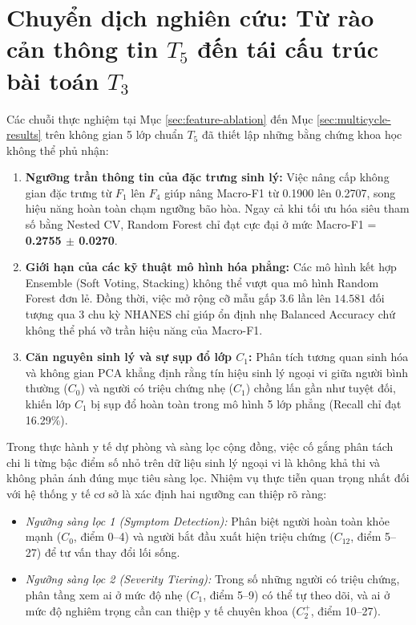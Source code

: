 \section{Chuyển dịch nghiên cứu: Từ rào cản thông tin $T_5$ đến tái cấu trúc bài toán $T_3$}
\label{sec:chuyen-dich-t5-t3}

Các chuỗi thực nghiệm tại Mục \ref{sec:feature-ablation} đến Mục \ref{sec:multicycle-results} trên không gian 5 lớp chuẩn $T_5$ đã thiết lập những bằng chứng khoa học không thể phủ nhận:
\begin{enumerate}
    \item \textbf{Ngưỡng trần thông tin của đặc trưng sinh lý:} Việc nâng cấp không gian đặc trưng từ $F_1$ lên $F_4$ giúp nâng Macro-F1 từ 0.1900 lên 0.2707, song hiệu năng hoàn toàn chạm ngưỡng bão hòa. Ngay cả khi tối ưu hóa siêu tham số bằng Nested CV, Random Forest chỉ đạt cực đại ở mức Macro-F1 = \textbf{0.2755 $\pm$ 0.0270}.
    \item \textbf{Giới hạn của các kỹ thuật mô hình hóa phẳng:} Các mô hình kết hợp Ensemble (Soft Voting, Stacking) không thể vượt qua mô hình Random Forest đơn lẻ. Đồng thời, việc mở rộng cỡ mẫu gấp 3.6 lần lên $14.581$ đối tượng qua 3 chu kỳ NHANES chỉ giúp ổn định nhẹ Balanced Accuracy chứ không thể phá vỡ trần hiệu năng của Macro-F1.
    \item \textbf{Căn nguyên sinh lý và sự sụp đổ lớp $C_1$:} Phân tích tương quan sinh hóa và không gian PCA khẳng định rằng tín hiệu sinh lý ngoại vi giữa người bình thường ($C_0$) và người có triệu chứng nhẹ ($C_1$) chồng lấn gần như tuyệt đối, khiến lớp $C_1$ bị sụp đổ hoàn toàn trong mô hình 5 lớp phẳng (Recall chỉ đạt 16.29\%).
\end{enumerate}

Trong thực hành y tế dự phòng và sàng lọc cộng đồng, việc cố gắng phân tách chi li từng bậc điểm số nhỏ trên dữ liệu sinh lý ngoại vi là không khả thi và không phản ánh đúng mục tiêu sàng lọc. Nhiệm vụ thực tiễn quan trọng nhất đối với hệ thống y tế cơ sở là xác định hai ngưỡng can thiệp rõ ràng:
\begin{itemize}
    \item \textit{Ngưỡng sàng lọc 1 (Symptom Detection):} Phân biệt người hoàn toàn khỏe mạnh ($C_0$, điểm 0--4) và người bắt đầu xuất hiện triệu chứng ($C_{12}$, điểm 5--27) để tư vấn thay đổi lối sống.
    \item \textit{Ngưỡng sàng lọc 2 (Severity Tiering):} Trong số những người có triệu chứng, phân tầng xem ai ở mức độ nhẹ ($C_1$, điểm 5--9) có thể tự theo dõi, và ai ở mức độ nghiêm trọng cần can thiệp y tế chuyên khoa ($C_2^+$, điểm 10--27).
\end{itemize}

